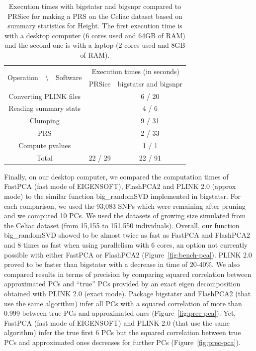 \documentclass{bioinfo}
\begin{document}
\begin{table}[!tpb]
\begin{center}
\begin{adjustbox}{max width=235pt}
\begin{tabular}{|c|c|c|}
\hline
\multirow{2}{*}{Operation~~\textbackslash~~Software} &   \multicolumn{2}{c|}{Execution times (in seconds)} \\
 \cline{2-3}
 & PRSice & bigstatsr and bigsnpr \\
\hline
Converting PLINK files   &  & 6 / 20 \\
Reading summary stats &  & 4 / 6  \\
Clumping              &  & 9 / 31 \\
PRS                   &  & 2 / 33 \\
Compute pvalues       &  & 1 / 1  \\
\hline
Total                 & 22 / 29 & 22 / 91 \\
\hline
\end{tabular} 
\end{adjustbox}
\end{center}
\caption{Execution times with bigstatsr and bigsnpr compared to PRSice for making a PRS on the Celiac dataset based on summary statistics for Height. The first execution time is with a desktop computer (6 cores used and 64GB of RAM) and the second one is with a laptop (2 cores used and 8GB of RAM).}
\label{tab:bench-prs}
\end{table}

Finally, on our desktop computer, we compared the computation times of FastPCA (fast mode of EIGENSOFT), FlashPCA2 and PLINK 2.0 (approx mode) to the similar function big\_randomSVD implemented in bigstatsr. For each comparison, we used the 93,083 SNPs which were remaining after pruning and we computed 10 PCs. We used the datasets of growing size simulated from the Celiac dataset (from 15,155 to 151,550 individuals). Overall, our function  big\_randomSVD showed to be almost twice as fast as FastPCA and FlashPCA2 and 8 times as fast when using parallelism with 6 cores, an option not currently possible with either FastPCA or FlashPCA2 (Figure~\ref{fig:bench-pca}). PLINK 2.0 proved to be faster than bigstatsr with a decrease in time of 20-40\%. 
We also compared results in terms of precision by comparing squared correlation between approximated PCs and ``true'' PCs provided by an exact eigen decomposition obtained with PLINK 2.0 (exact mode). 
Package bigstatsr and FlashPCA2 (that use the same algorithm) infer all PCs with a squared correlation of more than 0.999 between true PCs and approximated ones (Figure~\ref{fig:prec-pca}). Yet, FastPCA (fast mode of EIGENSOFT) and PLINK 2.0 (that use the same algorithm) infer the true first 6 PCs but the squared correlation between true PCs and approximated ones decreases for further PCs (Figure~\ref{fig:prec-pca}).   
\end{document}

